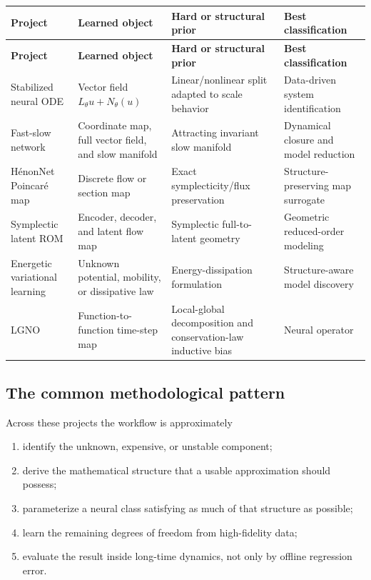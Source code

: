 \documentclass[11pt]{article}
\begin{document}
\begin{longtable}{@{}P{0.215\textwidth}P{0.235\textwidth}P{0.25\textwidth}P{0.22\textwidth}@{}}
\toprule
\textbf{Project} & \textbf{Learned object} & \textbf{Hard or structural prior} & \textbf{Best classification} \\
\midrule
\endfirsthead
\toprule
\textbf{Project} & \textbf{Learned object} & \textbf{Hard or structural prior} & \textbf{Best classification} \\
\midrule
\endhead
Stabilized neural ODE & Vector field \(L_\theta u+N_\theta(u)\) & Linear/nonlinear split adapted to scale behavior & Data-driven system identification \\
Fast-slow network & Coordinate map, full vector field, and slow manifold & Attracting invariant slow manifold & Dynamical closure and model reduction \\
H\'enonNet Poincar\'e map & Discrete flow or section map & Exact symplecticity/flux preservation & Structure-preserving map surrogate \\
Symplectic latent ROM & Encoder, decoder, and latent flow map & Symplectic full-to-latent geometry & Geometric reduced-order modeling \\
Energetic variational learning & Unknown potential, mobility, or dissipative law & Energy-dissipation formulation & Structure-aware model discovery \\
LGNO & Function-to-function time-step map & Local-global decomposition and conservation-law inductive bias & Neural operator \\
\bottomrule
\end{longtable}

\subsection{The common methodological pattern}

Across these projects the workflow is approximately
\begin{enumerate}
  \item identify the unknown, expensive, or unstable component;
  \item derive the mathematical structure that a usable approximation should possess;
  \item parameterize a neural class satisfying as much of that structure as possible;
  \item learn the remaining degrees of freedom from high-fidelity data;
  \item evaluate the result inside long-time dynamics, not only by offline regression error.
\end{enumerate}
\end{document}
